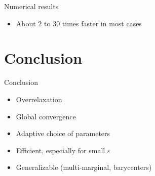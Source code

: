 \documentclass[compress]{beamer}
\renewcommand{\epsilon}{\varepsilon}
\begin{document}
\begin{frame}{Numerical results}
\begin{itemize}
\begin{columns}
\begin{column}{0.5\textwidth}
			\footnotesize  Random cost, uniform marginals
		\end{column}
	\end{columns}
	\vspace{0.2cm}
	\item About 2 to 30 times faster in most cases
	\end{itemize}
\end{frame}


\section*{Conclusion}
\begin{frame}{Conclusion}
	\begin{itemize}
		\item Overrelaxation
		\item Global convergence
		\item Adaptive choice of parameters
		\item Efficient, especially for small $\epsilon$
		\item Generalizable (multi-marginal, barycenters)
	\end{itemize}
\end{frame}
\end{document}
